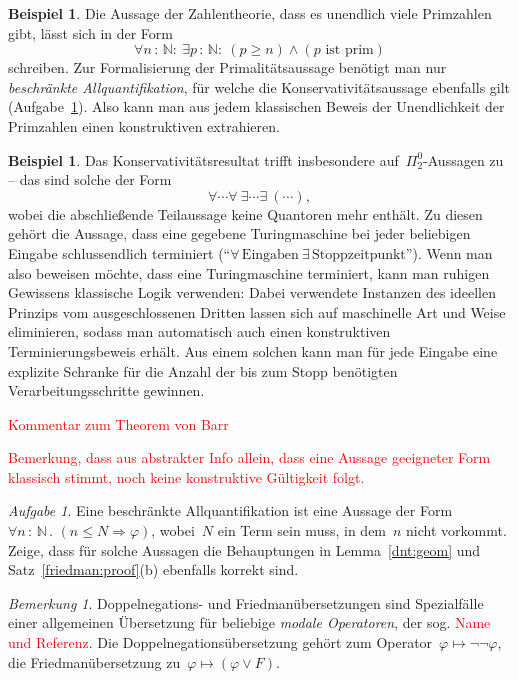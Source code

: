 \documentclass[a4paper,ngerman,12pt]{scrartcl}
\theoremstyle{definition}
\newtheorem{bsp}[defn]{Beispiel}
\theoremstyle{plain}
\theoremstyle{remark}
\newtheorem{bem}[defn]{Bemerkung}
\newtheorem{aufg}[defn]{Aufgabe}
\newcommand{\NN}{\mathbb{N}}
\renewcommand{\_}{\mathpunct{.}\,}
\newcommand{\?}{\,{:}\,}
\newcommand{\XXX}[1]{\textcolor{red}{#1}}
\begin{document}
\begin{bsp}Die Aussage der Zahlentheorie, dass es unendlich viele Primzahlen
gibt, lässt sich in der Form
\[ \forall n\?\NN{:}\ \exists p\?\NN{:}\ (p \geq n) \wedge (\text{$p$ ist prim}) \]
schreiben. Zur Formalisierung der Primalitätsaussage benötigt man nur
\emph{beschränkte Allquantifikation}, für welche die Konservativitätsaussage
ebenfalls gilt (Aufgabe~\ref{aufg-beschr-allquant}). Also kann man aus jedem klassischen Beweis der Unendlichkeit
der Primzahlen einen konstruktiven extrahieren.
\end{bsp}

\begin{bsp}Das Konservativitätsresultat trifft insbesondere
auf~$\Pi^0_2$-Aussagen zu -- das sind solche der Form
\[ \forall \cdots \forall\ \exists \cdots \exists\ (\cdots), \]
wobei die abschließende Teilaussage keine Quantoren mehr enthält. Zu diesen
gehört die Aussage, dass eine gegebene Turingmaschine bei jeder
beliebigen Eingabe schlussendlich terminiert ("`$\forall\,\text{Eingaben}\
\exists\,\text{Stoppzeitpunkt}$"'). Wenn man also beweisen möchte, dass eine
Turingmaschine terminiert, kann man ruhigen Gewissens klassische Logik
verwenden: Dabei verwendete Instanzen des ideellen Prinzips vom ausgeschlossenen Dritten
lassen sich auf maschinelle Art und Weise eliminieren, sodass man automatisch
auch einen konstruktiven Terminierungsbeweis erhält. Aus einem solchen kann man
für jede Eingabe eine explizite Schranke für die Anzahl der bis zum Stopp
benötigten Verarbeitungsschritte gewinnen.
\end{bsp}

\XXX{Kommentar zum Theorem von Barr}

\XXX{Bemerkung, dass aus abstrakter Info allein, dass eine Aussage geeigneter
Form klassisch stimmt, noch keine konstruktive Gültigkeit folgt.}

\begin{aufg}\label{aufg-beschr-allquant}Eine beschränkte Allquantifikation ist
eine Aussage der Form~$\forall n\?\NN\_ (n \leq N \Rightarrow \varphi)$,
wobei~$N$ ein Term sein muss, in dem~$n$ nicht vorkommt. Zeige,
dass für solche Aussagen die Behauptungen in Lemma~\ref{dnt:geom} und
Satz~\ref{friedman:proof}(b) ebenfalls korrekt sind.\end{aufg}

\begin{bem}Doppelnegations- und Friedmanübersetzungen sind Spezialfälle einer
allgemeinen Übersetzung für beliebige \emph{modale Operatoren}, der sog.
\XXX{Name und Referenz}. Die
Doppelnegationsübersetzung gehört zum Operator~$\varphi \mapsto
\neg\neg\varphi$, die Friedmanübersetzung zu~$\varphi \mapsto (\varphi \vee F)$.\end{bem}
\end{document}
